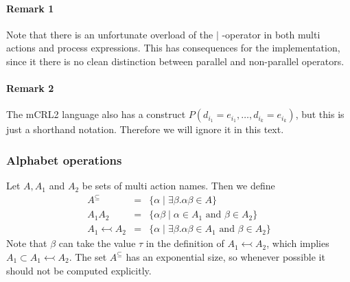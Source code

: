 \documentclass{article}
\begin{document}
\paragraph{Remark 1}

Note that there is an unfortunate overload of the $\boldsymbol{\mid }$%
-operator in both multi actions and process expressions. This has
consequences for the implementation, since it there is no clean distinction
between parallel and non-parallel operators.

\paragraph{Remark 2}

The mCRL2 language also has a construct $P(d_{i_{1}}=e_{i_{1}},\ldots
,d_{i_{k}}=e_{i_{k}})$, but this is just a shorthand notation. Therefore we
will ignore it in this text.

\subsubsection{Alphabet operations}

Let $A,A_{1}$ and $A_{2}$ be sets of multi action names. Then we define%
\[
\begin{array}{lll}
A^{\subseteq } & = & \{\alpha \mid \exists \beta .\alpha \beta \in A\} \\ 
A_{1}A_{2} & = & \{\alpha \beta \mid \alpha \in A_{1}\text{ and }\beta \in
A_{2}\} \\ 
A_{1}\leftarrowtail A_{2} & = & \{\alpha \mid \exists \beta .\alpha \beta
\in A_{1}\text{ and }\beta \in A_{2}\}%
\end{array}%
\]%
Note that $\beta $ can take the value $\tau $ in the definition of $%
A_{1}\leftarrowtail A_{2}$, which implies $A_{1}\subset A_{1}\leftarrowtail
A_{2}$. The set $A^{\subseteq }$ has an exponential size, so whenever
possible it should not be computed explicitly.
\end{document}
